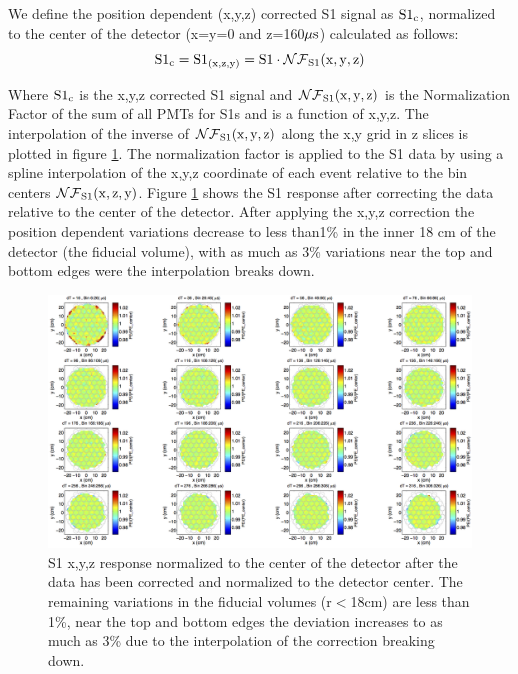 We define the position dependent  (x,y,z) corrected S1 signal as $\rm S1{_c}$, normalized to the center of the detector (x=y=0 and z=160$\rm \mu s$) calculated as follows:
\begin{equation}
\rm S1_{c}= S1_{(x,z,y)}=S1 \cdot \mathcal{NF}_{S1}(x,y,z)
\label{eq:S1_XYZ}
\end{equation}

Where $\rm S1_{c}$ is the x,y,z corrected S1 signal and $\rm \mathcal{NF}_{S1}(x,y,z)$ is the Normalization Factor of the sum of all PMTs for S1s and is a function of x,y,z. The interpolation of the inverse of $\rm \mathcal{NF}_{S1}(x,y,z)$ along the x,y grid in z slices is plotted in figure \ref{fig:S1_XYZ_norm_center}. The normalization factor is applied to the S1 data by using a spline interpolation of the x,y,z coordinate of each event relative to the bin centers $\rm \mathcal{NF}_{S1}(x,z,y)$. Figure \ref{fig:S1_XYZ_norm_center} shows the S1 response after correcting the data relative to the center of the detector. After applying the x,y,z correction the position dependent variations decrease to less than1\% in the inner 18 cm of the detector (the fiducial volume), with as much as 3\% variations near the top and bottom edges were the interpolation breaks down.

\begin{figure}[h!]\centering
\includegraphics[width=150mm]{Chapter_XYZ_Corr/Thesis_Corr_Plots/S1_XYZ_Kr_FlatField_norm_center_crop.png}
\caption{S1 x,y,z response normalized to the center of the detector after the data has been corrected and normalized to the detector center. The remaining variations in the fiducial volumes (r$<$18cm) are less than 1\%, near the top and bottom edges  the deviation increases to as much as 3\% due to the interpolation of the correction breaking down.}
\label{fig:S1_XYZ_norm_center}
\end{figure}

